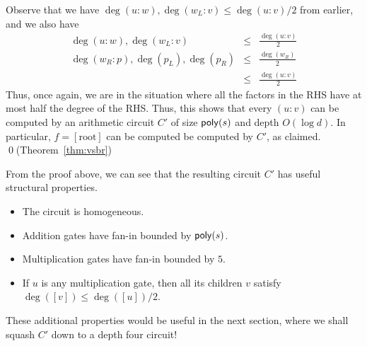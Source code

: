 Observe that we have $\deg (u:w), \deg(w_L:v) \leq \deg(u:v)/2$ from earlier, and we also have
\begin{eqnarray*}
\deg(u:w),\deg(w_L:v) & \leq &\frac{\deg(u:v)}{2}\\
\deg(w_R:p),\deg(p_L),\deg(p_R) & \leq & \frac{\deg(w_R)}{2}\\
 & \leq & \frac{\deg(u:v)}{2}
\end{eqnarray*}
Thus, once again, we are in the situation where all the factors in the RHS have at most half the degree of the RHS. Thus, this shows that every $(u:v)$ can be computed by an arithmetic circuit $C'$ of size $\mathsf{poly}(s)$ and depth $O(\log d)$. In particular, $f = [\mathrm{root}]$ can be computed be computed by $C'$, as claimed. \qed {(\footnotesize Theorem~\ref{thm:vsbr})}

\begin{remark}\label{remark:vsbr}
From the proof above, we can see that the resulting circuit $C'$ has useful structural properties. 
\begin{itemize}
  \item The circuit is homogeneous. 
  \item Addition gates have fan-in bounded by $\mathsf{poly}(s)$. 
  \item Multiplication gates have fan-in bounded by $5$. 
  \item If $u$ is any multiplication gate, then all its children $v$ satisfy $\deg([v])\leq \deg([u])/2$. 
\end{itemize}
\end{remark}

These additional properties would be useful in the next section, where we shall squash $C'$ down to a depth four circuit!


